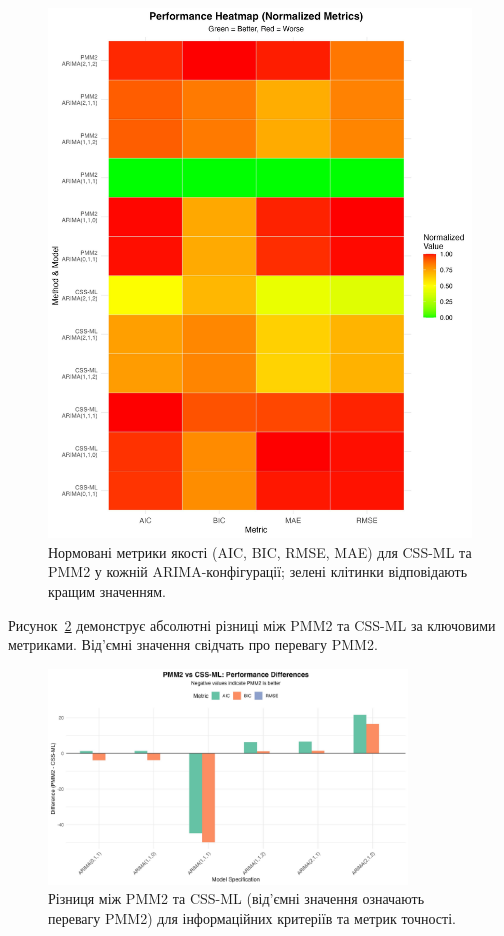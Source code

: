 \documentclass[12pt,a4paper]{article}
\begin{document}
\begin{figure}[htbp]
\centering
\includegraphics[width=\textwidth]{figures/07_performance_heatmap.pdf}
\caption{Нормовані метрики якості (AIC, BIC, RMSE, MAE) для CSS-ML та PMM2 у кожній ARIMA-конфігурації; зелені клітинки відповідають кращим значенням.}
\label{fig:performance_heatmap}
\end{figure}

Рисунок~\ref{fig:method_differences} демонструє абсолютні різниці між PMM2 та CSS-ML за ключовими метриками. Від'ємні значення свідчать про перевагу PMM2.

\begin{figure}[htbp]
\centering
\includegraphics[width=0.85\textwidth]{figures/08_method_differences.pdf}
\caption{Різниця між PMM2 та CSS-ML (від'ємні значення означають перевагу PMM2) для інформаційних критеріїв та метрик точності.}
\label{fig:method_differences}
\end{figure}
\end{document}
